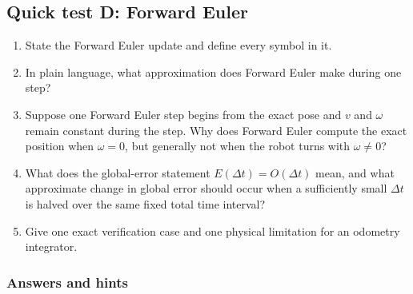 \documentclass[
  australian,
  12pt,
  letterpaper,
  DIV=11,
  numbers=noendperiod,
  twoside]{scrreprt}
\providecommand{\tightlist}{%
  \setlength{\itemsep}{0pt}\setlength{\parskip}{0pt}}
\begin{document}
\subsection*{Quick test D: Forward
Euler}\label{quick-test-d-forward-euler}

\begin{enumerate}
\def\labelenumi{\arabic{enumi}.}
\tightlist
\item
  State the Forward Euler update and define every symbol in it.
\item
  In plain language, what approximation does Forward Euler make during
  one step?
\item
  Suppose one Forward Euler step begins from the exact pose and \(v\)
  and \(\omega\) remain constant during the step. Why does Forward Euler
  compute the exact position when \(\omega=0\), but generally not when
  the robot turns with \(\omega\neq0\)?
\item
  What does the global-error statement \(E(\Delta t)=O(\Delta t)\) mean,
  and what approximate change in global error should occur when a
  sufficiently small \(\Delta t\) is halved over the same fixed total
  time interval?
\item
  Give one exact verification case and one physical limitation for an
  odometry integrator.
\end{enumerate}

\subsubsection*{Answers and hints}\label{answers-and-hints-9}
\end{document}
